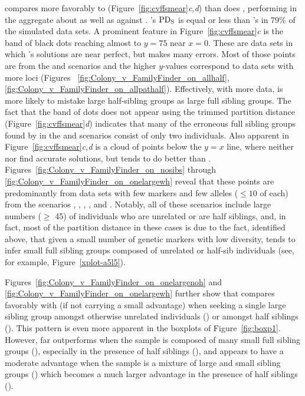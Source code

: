 \familyfinder{} compares more favorably to \colony{} (Figure~\ref{fig:cvffsmear}{\em c,d}) than does 
\kinalyzer{}, performing in the aggregate about as well as \prt{} against \colony{}. 
\colony{}'s $\mathrm{PD_S}$ is equal or less than \familyfinder{}'s in 79\% of the simulated data sets.
A prominent feature in Figure~\ref{fig:cvffsmear}{\em c} is the band of black dots reaching almost to 
$y=75$ near $x=0$.  These are data sets in which \colony{}'s solutions are near perfect, but 
\familyfinder{} makes many errors.  Most of those points are from the \allhalf{} and \allpathalf{} 
scenarios and the higher $y$-values correspond to data sets with more loci (Figures~
\ref{fig:Colony_v_FamilyFinder_on_allhalf}, \ref{fig:Colony_v_FamilyFinder_on_allpathalf}).  
Effectively, with more data, \familyfinder{} is more likely to mistake large half-sibling groups as 
large full sibling groups.  The fact that the band of dots does not appear using the trimmed partition 
distance (Figure~\ref{fig:cvffsmear}{\em d}) indicates that many of the erroneous full sibling groups 
found by \familyfinder{} in the \allhalf{} and \allpathalf{} scenarios consist of only two individuals.   
Also apparent in Figure~\ref{fig:cvffsmear}{\em c,d} is a cloud of points below the $y=x$ line, where 
neither \familyfinder{} nor \colony{} find accurate solutions, but \familyfinder{} tends to do better 
than \colony{}.  Figures~\ref{fig:Colony_v_FamilyFinder_on_nosibs} through 
\ref{fig:Colony_v_FamilyFinder_on_onelargewh} reveal that these points are predominantly from data sets 
with few markers and few alleles ($\leq 10$ of each) from the scenarios \allhalf{}, \allpathalf{}, 
\nosibs{}, \onelargenoh{}, and \onelargewh{}\@.  Notably, all of these scenarios include large numbers 
($\geq$ 45) of individuals who are unrelated or are half siblings, and, in fact, most of the partition 
distance in these cases is due to the fact, identified above, that given a small number of genetic 
markers with low diversity, \colony{} tends to infer small full sibling groups composed of unrelated or 
half-sib individuals (see, for example, Figure~\ref{xplot-a5l5}).  

Figures~\ref{fig:Colony_v_FamilyFinder_on_onelargenoh} and 
\ref{fig:Colony_v_FamilyFinder_on_onelargewh} further show that \familyfinder{} compares favorably with 
\colony{} (if not carrying a small advantage) when seeking a single large sibling group amongst 
otherwise unrelated individuals (\onelargenoh) or amongst half siblings (\onelargewh).  This pattern is 
even more apparent in the boxplots of Figure~\ref{fig:boxp1}.  However, \colony{} far outperforms 
\familyfinder{} when the sample is composed of many small full sibling groups (\sfsnoh), especially in 
the presence of half siblings (\sfswh), and \colony{} appears to have a moderate advantage when the 
sample is a mixture of large and small sibling groups (\slfsgnoh) which becomes a much larger advantage 
in the presence of half siblings (\slfsgwh).

